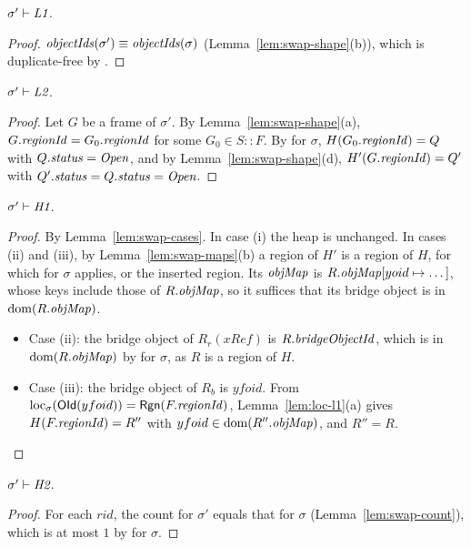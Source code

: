 \begin{lemma}[\inv{L1}] 
$\sigma' \vdash \textit{L1}$.
\end{lemma}
\begin{proof}
$\mathit{objectIds}(\sigma') \equiv \mathit{objectIds}(\sigma)$ (Lemma~\ref{lem:swap-shape}(b)), which is duplicate-free by
.
\end{proof}

\begin{lemma}[\inv{L2}] 
$\sigma' \vdash \textit{L2}$.
\end{lemma}
\begin{proof}
Let $G$ be a frame of $\sigma'$. By Lemma~\ref{lem:swap-shape}(a), $G.\mathit{regionId} = G_0.\mathit{regionId}$ for some
$G_0 \in S :: F$. By  for $\sigma$, $H(G_0.\mathit{regionId}) = Q$ with $Q.\mathit{status} = \mathit{Open}$, and by
Lemma~\ref{lem:swap-shape}(d), $H'(G.\mathit{regionId}) = Q'$ with $Q'.\mathit{status} = Q.\mathit{status} = \mathit{Open}$.
\end{proof}

\begin{lemma}[\inv{H1}] 
$\sigma' \vdash \textit{H1}$.
\end{lemma}
\begin{proof}
By Lemma~\ref{lem:swap-cases}. In case (i) the heap is unchanged. In cases (ii) and (iii), by
Lemma~\ref{lem:swap-maps}(b) a region of $H'$ is a region of $H$, for which  for $\sigma$
applies, or the inserted region. Its $\mathit{objMap}$ is $R.\mathit{objMap}[yoid \mapsto \dots]$, whose keys include
those of $R.\mathit{objMap}$, so it suffices that its bridge object is in $\mathrm{dom}(R.\mathit{objMap})$.
\begin{itemize}[nosep]
  \item Case (ii): the bridge object of $R_r(\mathit{xRef})$ is $R.\mathit{bridgeObjectId}$, which is in
    $\mathrm{dom}(R.\mathit{objMap})$ by  for $\sigma$, as $R$ is a region of $H$.
  \item Case (iii): the bridge object of $R_b$ is $yfoid$. From
    $\mathrm{loc}_{\sigma}(\mathsf{OId}(yfoid)) = \mathsf{Rgn}(F.\mathit{regionId})$, Lemma~\ref{lem:loc-l1}(a) gives $H(F.\mathit{regionId}) = R''$ with
    $yfoid \in \mathrm{dom}(R''.\mathit{objMap})$, and $R'' = R$. \qedhere
\end{itemize}
\end{proof}

\begin{lemma}[\inv{H2}] 
$\sigma' \vdash \textit{H2}$.
\end{lemma}
\begin{proof}
For each $rid$, the count for $\sigma'$ equals that for $\sigma$ (Lemma~\ref{lem:swap-count}), which
is at most $1$ by  for $\sigma$.
\end{proof}

